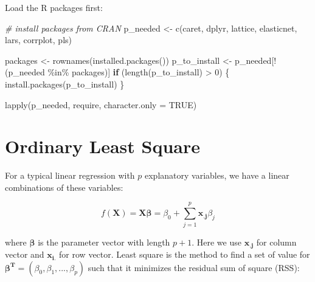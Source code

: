 \documentclass[
  12pt,
]{krantz}
\makeatletter
\newenvironment{Shaded}{\begin{snugshade}}{\end{snugshade}}
\newcommand{\AttributeTok}[1]{\textcolor[rgb]{0.61,0.61,0.61}{#1}}
\newcommand{\CommentTok}[1]{\textcolor[rgb]{0.37,0.37,0.37}{\textit{#1}}}
\newcommand{\ConstantTok}[1]{\textcolor[rgb]{0,0,0}{#1}}
\newcommand{\ControlFlowTok}[1]{\textcolor[rgb]{0.27,0.27,0.27}{\textbf{#1}}}
\newcommand{\DecValTok}[1]{\textcolor[rgb]{0.06,0.06,0.06}{#1}}
\newcommand{\FunctionTok}[1]{\textcolor[rgb]{0,0,0}{#1}}
\newcommand{\NormalTok}[1]{#1}
\newcommand{\OtherTok}[1]{\textcolor[rgb]{0.37,0.37,0.37}{#1}}
\newcommand{\SpecialCharTok}[1]{\textcolor[rgb]{0,0,0}{#1}}
\newcommand{\StringTok}[1]{\textcolor[rgb]{0.5,0.5,0.5}{#1}}
\newenvironment{kframe}{%
\medskip{}
\setlength{\fboxsep}{.8em}
 \def\at@end@of@kframe{}%
 \ifinner\ifhmode%
  \def\at@end@of@kframe{\end{minipage}}%
  \begin{minipage}{\columnwidth}%
 \fi\fi%
 \def\FrameCommand##1{\hskip\@totalleftmargin \hskip-\fboxsep
 \colorbox{shadecolor}{##1}\hskip-\fboxsep
     \hskip-\linewidth \hskip-\@totalleftmargin \hskip\columnwidth}%
 \MakeFramed {\advance\hsize-\width
   \@totalleftmargin\z@ \linewidth\hsize
   \@setminipage}}%
 {\par\unskip\endMakeFramed%
 \at@end@of@kframe}
\renewenvironment{Shaded}{\begin{kframe}}{\end{kframe}}
\makeatother
\begin{document}
Load the R packages first:

\begin{Shaded}
\begin{Highlighting}[]
\CommentTok{\# install packages from CRAN}
\NormalTok{p\_needed }\OtherTok{\textless{}{-}} \FunctionTok{c}\NormalTok{(}\StringTok{\textquotesingle{}caret\textquotesingle{}}\NormalTok{, }\StringTok{\textquotesingle{}dplyr\textquotesingle{}}\NormalTok{, }\StringTok{\textquotesingle{}lattice\textquotesingle{}}\NormalTok{,}
              \StringTok{\textquotesingle{}elasticnet\textquotesingle{}}\NormalTok{, }\StringTok{\textquotesingle{}lars\textquotesingle{}}\NormalTok{, }\StringTok{\textquotesingle{}corrplot\textquotesingle{}}\NormalTok{, }
              \StringTok{\textquotesingle{}pls\textquotesingle{}}\NormalTok{)}

\NormalTok{packages }\OtherTok{\textless{}{-}} \FunctionTok{rownames}\NormalTok{(}\FunctionTok{installed.packages}\NormalTok{())}
\NormalTok{p\_to\_install }\OtherTok{\textless{}{-}}\NormalTok{ p\_needed[}\SpecialCharTok{!}\NormalTok{(p\_needed }\SpecialCharTok{\%in\%}\NormalTok{ packages)]}
\ControlFlowTok{if}\NormalTok{ (}\FunctionTok{length}\NormalTok{(p\_to\_install) }\SpecialCharTok{\textgreater{}} \DecValTok{0}\NormalTok{) \{}
    \FunctionTok{install.packages}\NormalTok{(p\_to\_install)}
\NormalTok{\}}

\FunctionTok{lapply}\NormalTok{(p\_needed, require, }\AttributeTok{character.only =} \ConstantTok{TRUE}\NormalTok{)}
\end{Highlighting}
\end{Shaded}

\hypertarget{ordinary-least-square}{%
\section{Ordinary Least Square}\label{ordinary-least-square}}

For a typical linear regression with \(p\) explanatory variables, we have a linear combinations of these variables:

\[f(\mathbf{X})=\mathbf{X}\mathbf{\beta}=\beta_{0}+\sum_{j=1}^{p}\mathbf{x_{.j}}\beta_{j}\]

where \(\mathbf{\beta}\) is the parameter vector with length \(p+1\). Here we use \(\mathbf{x_{.j}}\) for column vector and \(\mathbf{x_{i.}}\) for row vector. Least square is the method to find a set of value for \(\mathbf{\beta^{T}}=(\beta_{0},\beta_{1},...,\beta_{p})\) such that it minimizes the residual sum of square (RSS):
\end{document}
